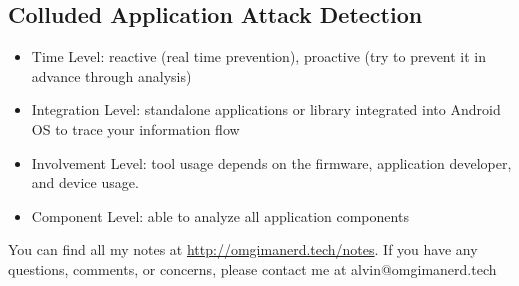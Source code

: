 \documentclass{math}
\begin{document}
\subsection*{Colluded Application Attack Detection}
\begin{itemize}
  \item Time Level: reactive (real time prevention), proactive (try to
    prevent it in advance through analysis)
  \item Integration Level: standalone applications or library integrated into
    Android OS to trace your information flow
  \item Involvement Level: tool usage depends on the firmware, application
    developer, and device usage.
  \item Component Level: able to analyze all application components
\end{itemize}

\begin{center}
  You can find all my notes at \url{http://omgimanerd.tech/notes}. If you have
  any questions, comments, or concerns, please contact me at
  alvin@omgimanerd.tech
\end{center}
\end{document}

